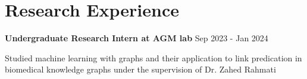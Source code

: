
\section{Research Experience}
\textbf{Undergraduate Research Intern at AGM lab} \hfill Sep 2023 - Jan 2024 
\begin{compactitem} 
\item Studied machine learning with graphs and their application to link predication in biomedical knowledge graphs under the supervision of Dr. Zahed Rahmati 
\end{compactitem}